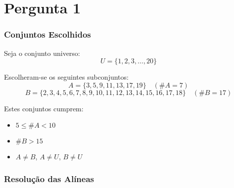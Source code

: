 \chapter{Pergunta 1}

\subsection*{Conjuntos Escolhidos}

Seja o conjunto universo:
\[
U = \{1, 2, 3, \ldots, 20\}
\]

Escolheram-se os seguintes subconjuntos:
\[
A = \{3, 5, 9, 11, 13, 17, 19\} \quad (\#A = 7)
\]
\[
B = \{2, 3, 4, 5, 6, 7, 8, 9, 10, 11, 12, 13, 14, 15, 16, 17, 18\} \quad (\#B = 17)
\]

Estes conjuntos cumprem:
\begin{itemize}
    \item \(5 \leq \#A < 10\)
    \item \(\#B > 15\)
    \item \(A \neq B\), \(A \neq U\), \(B \neq U\)
\end{itemize}

\subsection*{Resolução das Alíneas}

